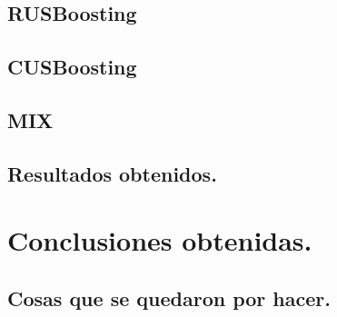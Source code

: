 \subsection{RUSBoosting}
\begin{algorithm}
\end{algorithm}
\subsection{CUSBoosting}
\begin{algorithm}
\end{algorithm}
\subsection{MIX}
\subsection{Resultados obtenidos.}
\section{Conclusiones obtenidas.}
\subsection{Cosas que se quedaron por hacer.}
